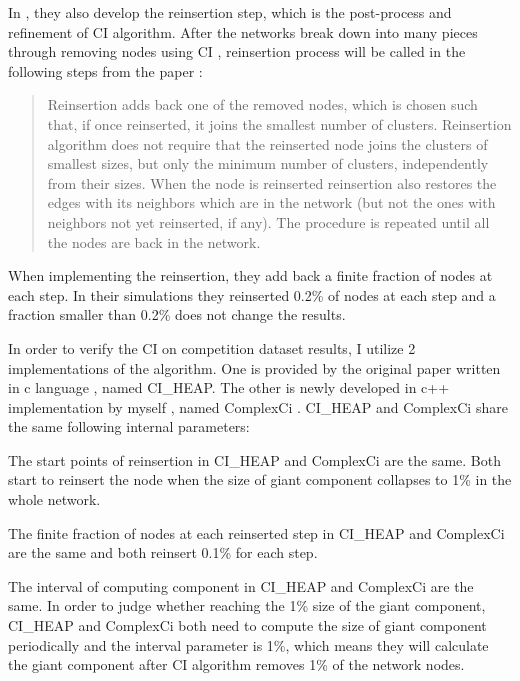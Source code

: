 \documentclass{article}
\newenvironment{itquote}
{\begin{quote}\itshape}
	{\end{quote}\ignorespacesafterend}
\begin{document}
	In \cite{morone2015influence} \cite{morone2016collective}, they also develop the reinsertion step, which is the post-process and  refinement of CI algorithm. After the networks break down into many pieces through removing nodes using CI , reinsertion process will be called in the following steps from the paper \cite{morone2016collective} : 
	
	\begin{itquote}
	
		Reinsertion adds back one of the removed nodes, which is chosen such that, if once reinserted, it joins the smallest number of clusters. Reinsertion algorithm does not require that the reinserted node joins the clusters of smallest sizes, but only the minimum number of clusters, independently from their sizes. When the node is reinserted reinsertion also restores the edges with its neighbors which are in the network (but not the ones with neighbors not yet reinserted, if any). The procedure is repeated until all the nodes are back in the network. 
	
	\end{itquote}
	
	When implementing the reinsertion, they add back a finite fraction of nodes at each step. In their simulations they reinserted 0.2\% of nodes at each step and a fraction smaller than 0.2\% does not change the results.
	
	In order to verify the CI on competition dataset results, I utilize 2 implementations of the algorithm. One is provided by the original paper written in c language \cite{ciheapccode}, named CI\_HEAP. The other is newly developed in c++ implementation by myself \cite{zhfkt2017887989} \cite{zhfktgithub}, named ComplexCi . 
	CI\_HEAP and ComplexCi share the same following internal parameters:
	
	
		\begin{enumerate}
		\begin{item}
			The start points of reinsertion in CI\_HEAP and ComplexCi are the same. Both start to reinsert the node when the size of giant component collapses to 1\% in the whole network.
		\end{item}
		\begin{item}
			The finite fraction of nodes at each reinserted step in CI\_HEAP and ComplexCi are the same and both reinsert 0.1\% for each step.
		\end{item}
		\begin{item}
			The interval of computing component in CI\_HEAP and ComplexCi are the same. In order to judge whether reaching the 1\% size of the giant component, CI\_HEAP and ComplexCi both need to compute the size of giant component periodically and the interval parameter is 1\%, which means they will calculate the giant component after CI algorithm removes 1\% of the network nodes.
		\end{item}	
	\end{enumerate}	
	
\end{document}
